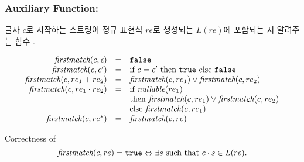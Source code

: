 % 
% 
% 
% 
% 
\begin{frame}[shrink]
\frametitle{Auxiliary Function: \firstmatch}

글자 $c$로 시작하는 스트링이 정규 표현식 $re$로 생성되는 $L(re)$에 포함되는 지 알려주는 함수 \firstmatch.

\[
\begin{array}{rcl}
  \firstmatch(c,\e) & = & \F \\
  \firstmatch(c,c') & = & \ifte{c=c'}{\T}{\F} \\
  \firstmatch(c,\rone+\rtwo) & = & \firstmatch(c,\rone) \vee \firstmatch(c,\rtwo) \\
  \firstmatch(c,\rone\cdot\rtwo) & = & \mrm{if } \nullable(\rone) \\
                          &   & \mrm{then }\firstmatch(c,\rone)\vee\firstmatch(c,\rtwo) \\
                          &   & \mrm{else }\firstmatch(c,\rone) \\
  \firstmatch(c,re^{*}) & = & \firstmatch(c,re)
\end{array}
\]

\begin{block}{Correctness of \firstmatch}
 \[
  \firstmatch(c,re)=\T\Lra\exists s\mrm{ such that }\cs\in L(re).%
 \]
\end{block}

\end{frame}

